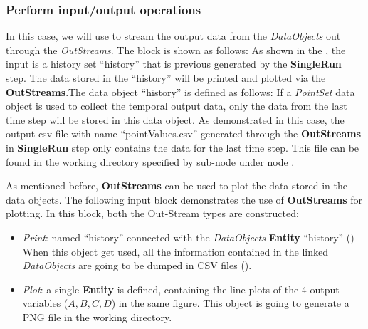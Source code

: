 \subsubsection{Perform input/output operations}
In this case, we will use  to stream the output data from the \textit{DataObjects} out through the
\textit{OutStreams}. The  block is shown as follows:
As shown in the , the input is a history set ``history'' that is previous generated by the \textbf{SingleRun}
step. The data stored in the ``history'' will be printed and plotted via the \textbf{OutStreams}.The data object
``history'' is defined as follows:
\nb If a \textit{PointSet} data object is used to collect the temporal output data, only the data from the last time
step will be stored in this data object. As demonstrated in this case, the output csv file with name ``pointValues.csv''
generated through the \textbf{OutStreams} in \textbf{SingleRun} step only contains the data for the last time step.
This file can be found in the working directory specified by sub-node  under node .

As mentioned before, \textbf{OutStreams} can be used to plot the data stored in the data objects. The following
input block demonstrates the use of \textbf{OutStreams} for plotting.
In this block, both the Out-Stream types are constructed:
\begin{itemize}
  \item \textit{Print}: named ``history'' connected with the \textit{DataObjects} \textbf{Entity} ``history'' ()
  When this object get used, all the information contained in the linked  \textit{DataObjects} are going
  to be dumped in CSV files ().
  \item \textit{Plot}: a single  \textbf{Entity} is defined, containing the line plots of the 4 output variables
  ($A,B,C,D$) in the same figure. This object is going to generate a PNG file in the working directory.
\end{itemize}

